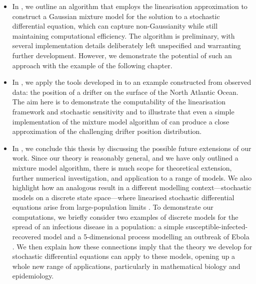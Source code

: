\begin{itemize}
	\item In , we outline an algorithm that employs the linearisation approximation to construct a Gaussian mixture model for the solution to a stochastic differential equation, which can capture non-Gaussianity while still maintaining computational efficiency.
	      The algorithm is preliminary, with several implementation details deliberately left unspecified and warranting further development.
	      However, we demonstrate the potential of such an approach with the example of the following chapter.

	\item In , we apply the tools developed in  to an example constructed from observed data: the position of a drifter on the surface of the North Atlantic Ocean.
	      The aim here is to demonstrate the computability of the linearisation framework and stochastic sensitivity and to illustrate that even a simple implementation of the mixture model algorithm of  can produce a close approximation of the challenging drifter position distribution.

	\item In , we conclude this thesis by discussing the possible future extensions of our work.
	      Since our theory is reasonably general, and we have only outlined a mixture model algorithm, there is much scope for theoretical extension, further numerical investigation, and application to a range of models.
	      We also highlight how an analogous result in a different modelling context---stochastic models on a discrete state space---where linearised stochastic differential equations arise from large-population limits \citep{Kurtz_1970_SolutionsOrdinaryDifferential,Kurtz_1971_LimitTheoremsSequences}.
	      To demonstrate our computations, we briefly consider two examples of discrete models for the spread of an infectious disease in a population: a simple susceptible-infected-recovered model and a 5-dimensional process modelling an outbreak of Ebola \citep{LegrandEtAl_2007_UnderstandingDynamicsEbola}.
	      We then explain how these connections imply that the theory we develop for stochastic differential equations can apply to these models, opening up a whole new range of applications, particularly in mathematical biology and epidemiology.


\end{itemize}



